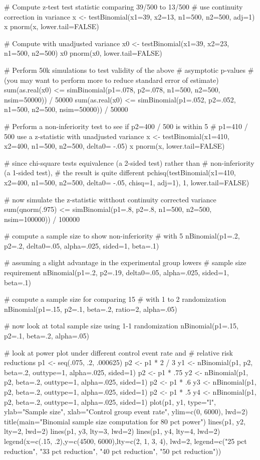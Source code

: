 \begin{Examples}
\begin{ExampleCode}
# Compute z-test test statistic comparing 39/500 to 13/500
# use continuity correction in variance
x <- testBinomial(x1=39, x2=13, n1=500, n2=500, adj=1)
x
pnorm(x, lower.tail=FALSE)

# Compute with unadjusted variance
x0 <- testBinomial(x1=39, x2=23, n1=500, n2=500)
x0
pnorm(x0, lower.tail=FALSE)

# Perform 50k simulations to test validity of the above
# asymptotic p-values 
# (you may want to perform more to reduce standard error of estimate)
sum(as.real(x0) <= 
    simBinomial(p1=.078, p2=.078, n1=500, n2=500, nsim=50000)) / 50000
sum(as.real(x0) <= 
    simBinomial(p1=.052, p2=.052, n1=500, n2=500, nsim=50000)) / 50000

# Perform a non-inferiority test to see if p2=400 / 500 is within 5
# p1=410 / 500 use a z-statistic with unadjusted variance
x <- testBinomial(x1=410, x2=400, n1=500, n2=500, delta0= -.05)
x
pnorm(x, lower.tail=FALSE)

# since chi-square tests equivalence (a 2-sided test) rather than
# non-inferiority (a 1-sided test), 
# the result is quite different
pchisq(testBinomial(x1=410, x2=400, n1=500, n2=500, delta0= -.05, 
                    chisq=1, adj=1), 1, lower.tail=FALSE)

# now simulate the z-statistic witthout continuity corrected variance
sum(qnorm(.975) <= 
    simBinomial(p1=.8, p2=.8, n1=500, n2=500, nsim=100000)) / 100000

# compute a sample size to show non-inferiority
# with 5%
nBinomial(p1=.2, p2=.2, delta0=.05, alpha=.025, sided=1, beta=.1)

# assuming a slight advantage in the experimental group lowers
# sample size requirement
nBinomial(p1=.2, p2=.19, delta0=.05, alpha=.025, sided=1, beta=.1)

# compute a sample size for comparing 15%
# with 1 to 2 randomization
nBinomial(p1=.15, p2=.1, beta=.2, ratio=2, alpha=.05)

# now look at total sample size using 1-1 randomization
nBinomial(p1=.15, p2=.1, beta=.2, alpha=.05)

# look at power plot under different control event rate and
# relative risk reductions
p1 <- seq(.075, .2, .000625)
p2 <- p1 * 2 / 3
y1 <- nBinomial(p1, p2, beta=.2, outtype=1, alpha=.025, sided=1)
p2 <- p1 * .75
y2 <- nBinomial(p1, p2, beta=.2, outtype=1, alpha=.025, sided=1)
p2 <- p1 * .6
y3 <- nBinomial(p1, p2, beta=.2, outtype=1, alpha=.025, sided=1)
p2 <- p1 * .5
y4 <- nBinomial(p1, p2, beta=.2, outtype=1, alpha=.025, sided=1)
plot(p1, y1, type="l", ylab="Sample size",
     xlab="Control group event rate", ylim=c(0, 6000), lwd=2)
title(main="Binomial sample size computation for 80 pct power")
lines(p1, y2, lty=2, lwd=2)
lines(p1, y3, lty=3, lwd=2)
lines(p1, y4, lty=4, lwd=2)
legend(x=c(.15, .2),y=c(4500, 6000),lty=c(2, 1, 3, 4), lwd=2,
       legend=c("25 pct reduction", "33 pct reduction",
                "40 pct reduction", "50 pct reduction"))
\end{ExampleCode}
\end{Examples}

